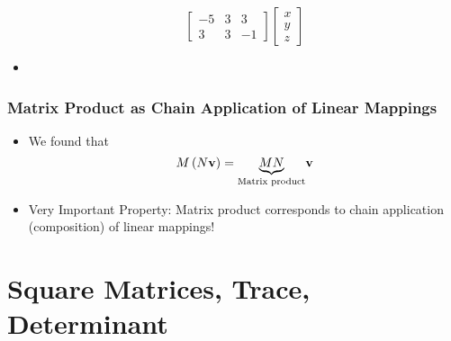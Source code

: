 \documentclass[8pt,dvipsnames]{beamer}
\newcommand{\myemph}[1]{{\color{blue}{#1}}}
\begin{document}
\begin{frame}
\begin{itemize}
{$$\begin{bmatrix}
      -5 & 3 & 3\\
      3 & 3 & -1
    \end{bmatrix}
    \begin{bmatrix}
      x\\y\\z
    \end{bmatrix}
    $$}
\item {}
  \end{itemize}
\end{frame}

\begin{frame}
  \frametitle{Matrix Product as Chain Application of Linear Mappings}
  \begin{itemize}
  \item We found that 
    $$
    M\left (N{\bf v}\right) = \underset{\text{Matrix product}}{\underbrace{M N}}{\bf v}
    $$
  \item \textcolor{RedOrange}{Very Important Property: Matrix product corresponds to chain application (composition) of linear mappings!}
  \end{itemize}
\end{frame}



\section{Square Matrices, Trace, Determinant}
\end{document}
